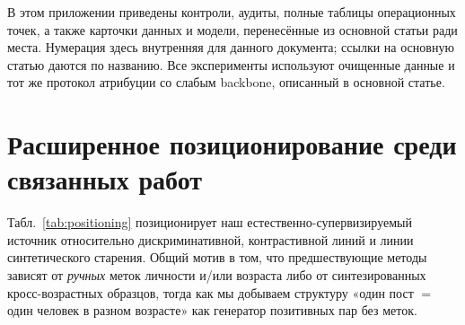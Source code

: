 \documentclass[10pt,twocolumn,letterpaper]{article}
\begin{document}

\noindent В этом приложении приведены контроли, аудиты, полные таблицы операционных точек, а также
карточки данных и модели, перенесённые из основной статьи ради места. Нумерация здесь внутренняя для
данного документа; ссылки на основную статью даются по названию. Все эксперименты используют очищенные
данные и тот же протокол атрибуции со слабым backbone, описанный в основной статье.

\section{Расширенное позиционирование среди связанных работ}\label{sup:positioning}
Табл.~\ref{tab:positioning} позиционирует наш естественно-супервизируемый источник относительно
дискриминативной, контрастивной линий и линии синтетического старения. Общий мотив в том, что
предшествующие методы зависят от \emph{ручных} меток личности и/или возраста либо от синтезированных
кросс-возрастных образцов, тогда как мы добываем структуру «один пост $=$ один человек в разном
возрасте» как генератор позитивных пар без меток.
\end{document}
